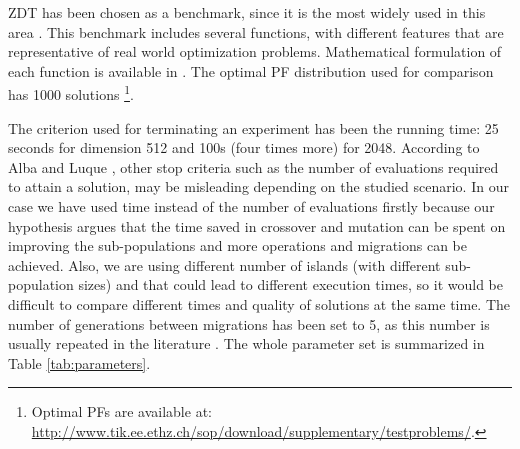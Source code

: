 \documentclass[preprint]{elsarticle}
\begin{document}
ZDT \citep{zdt2000a} has been chosen as a benchmark, since it is the most widely used in this area \citep{Deb03distributed,Martens13asynchronous,Wang09parallel,Durillo08masterslave}. This benchmark includes several functions, with different features that are representative of real world optimization problems. Mathematical formulation of each function is available in \citep{zdt2000a}.  The optimal PF distribution used for comparison has 1000 solutions \footnote{Optimal PFs are available at:   \url{http://www.tik.ee.ethz.ch/sop/download/supplementary/testproblems/}.}. 





The criterion used for terminating an experiment has been the running
time: 25 seconds for dimension 512 and 100s (four times more) for
2048. According to Alba and Luque \cite{EVALUATIONPARALLEL}, other stop criteria such as the number of evaluations required to attain a solution, may be misleading depending on the studied scenario. In our case we have used time instead of the number of evaluations firstly
because our hypothesis argues that the time saved in crossover and
mutation can be spent on improving the sub-populations and more
operations and migrations can be achieved. Also, we are using
different number of islands (with different sub-population sizes) and that
could lead to different execution times, so it would be difficult to
compare different times and quality of solutions at the same time. The number of generations between migrations has been set to 5, as this number is usually repeated in the literature \cite{Deb03distributed,Martens13asynchronous}.
 The whole parameter set is summarized in Table \ref{tab:parameters}.
\end{document}
